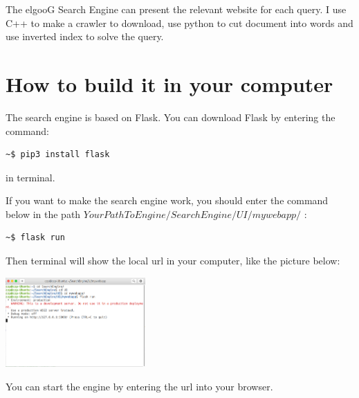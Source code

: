 \documentclass[a4paper]{article}
\begin{document}
	The elgooG Search Engine can present the relevant website for each query. I use C++ to make a crawler to download, use python to cut document into words and use inverted index to solve the query.

\section{How to build it in your computer}
	
	The search engine is based on Flask. You can download Flask by entering the command: 
\begin{lstlisting}
~$ pip3 install flask
\end{lstlisting}
	in terminal.
	
	If you want to make the search engine work, you should enter the command below in the path $YourPathToEngine/SearchEngine/UI/mywebapp/$ :
\begin{lstlisting}
~$ flask run
\end{lstlisting}
	
	Then terminal will show the local url in your computer, like the picture below:
	\begin{center}
		\includegraphics[width=0.4\textwidth, height=0.15\textheight]{terminal.png}
	\end{center}

	You can start the engine by entering the url into your browser.
\end{document}
